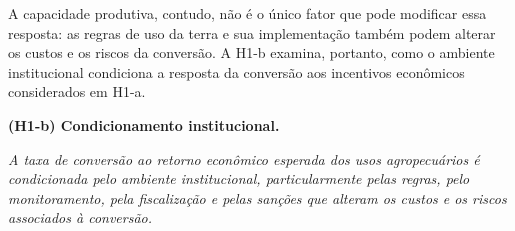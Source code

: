 A capacidade produtiva, contudo, não é o único fator que pode modificar essa resposta: as regras de uso da terra e sua implementação também podem alterar os custos e os riscos da conversão. A H1-b examina, portanto, como o ambiente institucional condiciona a resposta da conversão aos incentivos econômicos considerados em H1-a.

\medskip

\noindent\textbf{(H1-b) Condicionamento institucional.}

\noindent\emph{A taxa de conversão ao retorno econômico esperada dos usos agropecuários é condicionada pelo ambiente institucional, particularmente pelas regras, pelo monitoramento, pela fiscalização e pelas sanções que alteram os custos e os riscos associados à conversão.}

